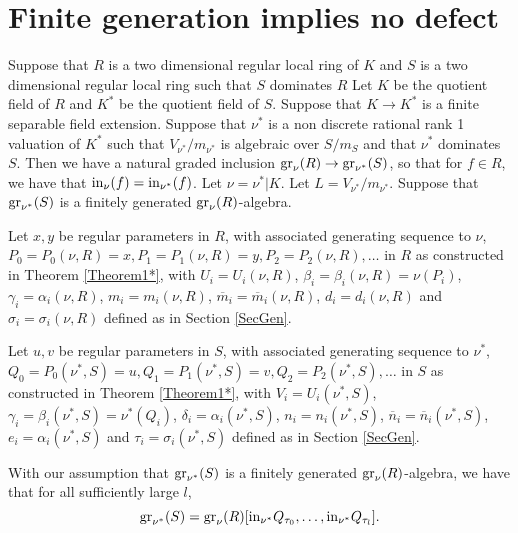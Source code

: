 \documentclass[11pt]{amsart}
\begin{document}
\section{Finite generation implies no defect}

Suppose that $R$ is a two dimensional regular  local ring of $K$ and $S$ is a two dimensional regular  local ring  such that  $S$ dominates $R$ 
Let $K$ be the quotient field of $R$ and $K^*$ be the quotient field of $S$. Suppose that $K\rightarrow K^*$ is a finite separable field extension. Suppose that $\nu^*$ is a non discrete rational rank 1 valuation of $K^*$ 
such that $V_{\nu^*}/m_{\nu^*}$ is algebraic over $S/m_S$ and that  $\nu^*$ dominates $S$. Then we have a natural graded inclusion ${\rm gr}_{\nu}(R)\rightarrow {\rm gr}_{\nu^*}(S)$, so that for $f\in R$, we have that ${\rm in}_{\nu}(f)={\rm in}_{\nu^*}(f)$. Let $\nu=\nu^*|K$. Let $L=V_{\nu^*}/m_{\nu^*}$. Suppose that 
 ${\rm gr}_{\nu^*}(S)$ is a finitely generated  ${\rm gr}_{\nu}(R)$-algebra.




Let $x,y$ be regular parameters in $R$, with associated generating sequence to $\nu$, $P_0=P_0(\nu,R)=x,P_1=P_1(\nu,R)=y,P_2=P_2(\nu,R),\ldots$  in $R$ as constructed in Theorem \ref{Theorem1*}, with $U_i=U_i(\nu,R)$, $\beta_i=\beta_i(\nu,R)=\nu(P_i)$, $\gamma_i=\alpha_i(\nu,R)$, $m_i=m_i(\nu,R)$, $\overline m_i=\overline m_i(\nu,R)$, $d_i=d_i(\nu,R)$ and $\sigma_i=\sigma_i(\nu,R)$ defined as in Section \ref{SecGen}.

Let $u,v$ be regular parameters in $S$, with associated generating sequence to $\nu^*$, $Q_0=P_0(\nu^*,S)=u,Q_1=P_1(\nu^*,S)=v,Q_2=P_2(\nu^*,S),\ldots$  in $S$ as constructed in Theorem \ref{Theorem1*}, with $V_i=U_i(\nu^*,S)$, $\gamma_i=\beta_i(\nu^*,S)=\nu^*(Q_i)$, $\delta_i=\alpha_i(\nu^*,S)$, $n_i=n_i(\nu^*,S)$, $\overline n_i=\overline n_i(\nu^*,S)$, $e_i=\alpha_i(\nu^*,S)$ and $\tau_i=\sigma_i(\nu^*,S)$ defined as in Section \ref{SecGen}.


With our assumption that ${\rm gr}_{\nu^*}(S)$ is a finitely generated  ${\rm gr}_{\nu}(R)$-algebra, we have that for all sufficiently large $l$, 
\begin{equation}\label{eq6}
{\rm gr}_{\nu^*}(S)={\rm gr}_{\nu}(R)[{\rm in}_{\nu^*}Q_{\tau_0},\ldots,{\rm in}_{\nu^*}Q_{\tau_l}].
\end{equation}
\end{document}
